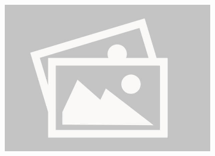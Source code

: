 \documentclass[a4paper,12pt]{report}
\begin{document}
\begin{figure}[H]
\begin{subfigure}{0.32\linewidth}
        \includegraphics[width=0.99\linewidth]{./photos/placeholder.jpg}
    \end{subfigure}
\end{figure}
\end{document}
